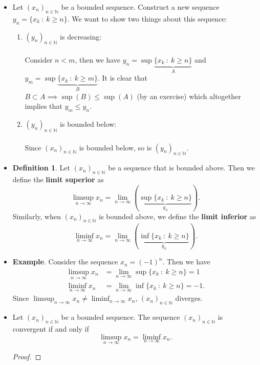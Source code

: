 \documentclass{article}
\newcommand{\N}{\mathbb{N}}
\newcommand{\seq}[2]{(#1_{#2})_{#2 \in \N}}
\newcommand{\mylimmm}[2]{\lim\limits_{#1 \to #2}}
\newcommand{\?}{\stackrel{?}{=}}
\theoremstyle{definition} %
\newtheorem{definition}[subsection]{Definition} %
\begin{document}
\begin{itemize}
    \item Let $\seq{x}{n}$ be a bounded sequence. Construct a new sequence $y_n = \{x_k \ : \ k \geq n\}$. We want to show two things about this sequence:
    \begin{enumerate}[label=(\arabic*)]
        \item $\seq{y}{n}$ is decreasing: \\\\
        Consider $n < m$, then we have $y_n = \sup\underbrace{\{x_k \ : \ k \geq n\}}_{A}$ and $y_m = \sup\underbrace{\{x_k \ : \ k \geq m\}}_{B}$. It is clear that $B \subset A \implies \sup(B) \leq \sup(A)$ (by an exercise) which altogether implies that $y_m \leq y_n$.
        \item $\seq{y}{n}$ is bounded below: \\\\
        Since $\seq{x}{n}$ is bounded below, so is $\seq{y}{n}$.
    \end{enumerate}
    \item[]
    \begin{definition}
        Let $\seq{x}{n}$ be a sequence that is bounded above. Then we define the \textbf{limit superior} as
    $$\limsup_{n \to \infty} x_n = \mylimmm{n}{\infty} \left(\underbrace{\sup\{x_k \ : \ k \geq n\}}_{y_n}\right).$$
    Similarly, when $\seq{x}{n}$ is bounded above, we define the \textbf{limit inferior} as
    $$\liminf_{n \to \infty} x_n = \mylimmm{n}{\infty} \left(\underbrace{\inf\{x_k \ : \ k \geq n\}}_{y_n}\right).$$
    \end{definition}
    \item \textbf{Example}. Consider the sequence $x_n = (-1)^n$. Then we have
    \begin{align*}
        \limsup_{n \to \infty} x_n &= \mylimmm{n}{\infty} \sup\{x_k \ : \ k \geq n\} = 1 \\
        \liminf_{n \to \infty} x_n &= \mylimmm{n}{\infty} \inf\{x_k \ : \ k \geq n\} = -1.
    \end{align*}
    Since $\limsup_{n \to \infty} x_n \neq \liminf_{n \to \infty} x_n$, $\seq{x}{n}$ diverges.
    \item[]
    \begin{theorem}
        Let $\seq{x}{n}$ be a bounded sequence. The sequence $\seq{x}{n}$ is convergent if and only if
    $$\limsup_{n \to \infty} x_n = \liminf_{n \to \infty} x_n.$$
    \end{theorem}
    \begin{proof}

\end{proof}
\end{itemize}
\end{document}
